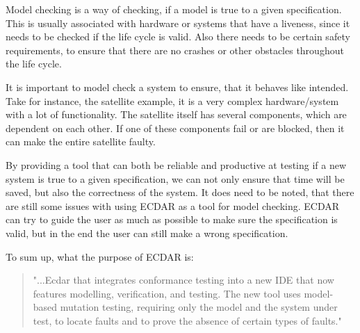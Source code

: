 Model checking is a way of checking, if a model is true to a given specification.
This is usually associated with hardware or systems that have a liveness, since it needs to be checked if the life cycle is valid.
Also there needs to be certain safety requirements, to ensure that there are no crashes or other obstacles throughout the life cycle.

It is important to model check a system to ensure, that it behaves like intended.
Take for instance, the satellite example, it is a very complex hardware/system with a lot of functionality.
The satellite itself has several components, which are dependent on each other.
If one of these components fail or are blocked, then it can make the entire satellite faulty.

By providing a tool that can both be reliable and productive at testing if a new system is true to a given specification, we can not only ensure that time will be saved, but also the correctness of the system.
It does need to be noted, that there are still some issues with using ECDAR as a tool for model checking.
ECDAR can try to guide the user as much as possible to make sure the specification is valid, but in the end the user can still make a wrong specification.


To sum up, what the purpose of ECDAR is:
\begin{quote}
"...Ecdar that integrates conformance testing into a new IDE that now features
modelling, verification, and testing. The new tool uses model-based mutation testing, requiring only
the model and the system under test, to locate faults and to prove the absence of certain types of faults." \cite{Gundersen_2018}
\end{quote}



